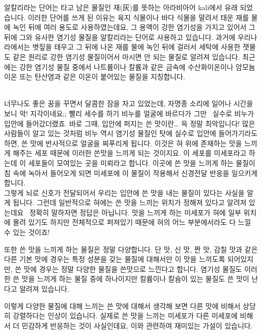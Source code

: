 \documentclass[12pt, a4paper, twoside]{book}
\begin{document}
				알칼리라는 단어는 타고 남은 물질인 재(灰)를 뜻하는 아라비아어 kali에서 유래 되었습니다. 
				이러한 단어를 쓰게 된 이유는 육지 식물이나 바다 식물을 말려서 태운 재를 물에 녹인 뒤에 여러 용도로 사용하였는데요, 그 용액이 강한 염기성을 가지고 있어서 그 뒤에 그와 유사한 염기성 물질을 알칼리라는 단어로 사용하고 있습니다. 
				과거에 우리나라에서는 볏짚을 태우고 그 뒤에 나온 재를 물에 녹인 뒤에 걸러서 세탁에 사용한 잿물도 같은 원리로 강한 염기성 물질이어서 마시면 안 되는 물질로 알려져 있습니다. 
				최근에는 강한 염기성 물질 중에서 나트륨이나 칼륨과 같은 금속에 수산화이온이나 암모늄이온 또는 탄산염과 같은 이온이 붙어있는 물질을 지칭합니다. \\
				 
				
				너무나도 좋은 꿈을 꾸면서 달콤한 잠을 자고 있었는데, 자명종 소리에 일어나 시간을 보니 악! 지각이네요;; 빨리 세수를 하기 비누를 얼굴에 바르다가 그만~ 실수로 비누가 입안에 들어갔더랬죠. 바로 그때, 입안에 퍼지는 쓴 맛이란… 윽 정말 최악입니다!
				많은 사람들이 알고 있는 것처럼 비누 역시 염기성 물질인 탓에 실수로 입안에 들어가기라도 하면, 쓴 맛에 반사적으로 얼굴을 찌푸리게 됩니다. 
				이것은 혀 위에 존재하는 맛을 느끼게 해주는 세포 때문에 이러한 쓴맛을 느끼게 되는 것이지요. 
				이 세포를 미세포라고 하는데 이 세포들이 모여있는 곳을 미뢰라고 합니다. 
				이곳에 쓴 맛을 느끼게 하는 물질이 침 속에 녹아서 들어오게 되면 미세포에 이 물질이 작용해서 신경전달 반응을 일으키게 합니다. \\
				
				그렇게 뇌로 신호가 전달되어서 우리는 입안에 쓴 맛을 내는 물질이 있다는 사실을 알게 됩니다. 
				그런데 일반적으로 혀에는 쓴 맛을 느끼는 위치가 정해져 있다고 알려져 있는데요~ 정확히 말하자면 정답은 아닙니다. 
				맛을 느끼게 하는 미세포가 혀에 일부 위치에 몰려 있기도 하지만 전체적으로 퍼져있기 때문에 혀의 어느 부분에서라도 다 느낄 수 있는 것이죠!
				
				또한 쓴 맛을 느끼게 하는 물질은 정말 다양합니다. 
				단 맛, 신 맛, 짠 맛, 감칠 맛과 같은 다른 기본 맛에 경우는 특정 성분을 갖는 물질에 대해서만 이 맛을 느끼도록 되어있지만, 쓴 맛에 경우는 정말 다양한 물질을 쓴맛으로 느낀다고 합니다. 
				염기성 물질도 이러한 쓴 맛을 느끼게 하는 물질 중에 하나이지만 칼륨이나 칼슘이 있는 물질도 쓴 맛이 난다고 알려져 있습니다.
				
				 
				이렇게 다양한 물질에 대해 느끼는 쓴 맛에 대해서 생각해 보면 다른 맛에 비해서 상당히 강렬하다는 인상이 있습니다. 
				실제로 쓴 맛을 느끼는 미세포가 다른 미세포에 비해서 더 민감하게 반응하는 것이 사실인데요, 이와 관련하여 재미있는 가설이 있습니다.
				 
\end{document}
